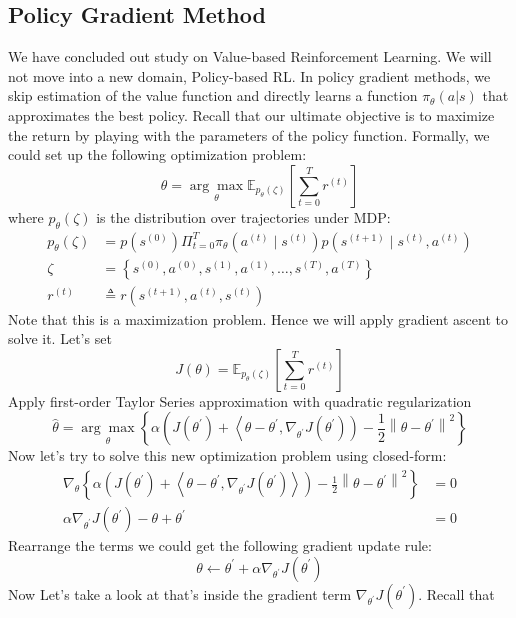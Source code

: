 \documentclass[11pt]{article}
\begin{document}
\subsection{Policy Gradient Method}
We have concluded out study on Value-based Reinforcement Learning. We will not move into a new domain, Policy-based RL. In policy gradient methods, we skip estimation of the value function and directly learns a function $\pi_\theta(a|s)$ that approximates the best policy. Recall that our ultimate objective is to maximize the return by playing with the parameters of the policy function. Formally, we could set up the following optimization problem: $$\hat{\theta}=\underset{\theta}{\arg \max } \mathbb{E}_{p_{\theta}(\zeta)}\left[\sum_{t=0}^{T} r^{(t)}\right]$$ where $p_{\theta}(\zeta)$ is the distribution over trajectories under MDP: 
\begin{align*}
    p_{\theta}(\zeta)&=p\left(s^{(0)}\right) \Pi_{t=0}^{T} \pi_{\theta}\left(a^{(t)} \mid s^{(t)}\right) p\left(s^{(t+1)} \mid s^{(t)}, a^{(t)}\right) \\
\zeta&=\left\{s^{(0)}, a^{(0)}, s^{(1)}, a^{(1)}, \ldots, s^{(T)}, a^{(T)}\right\} \\
r^{(t)} &\triangleq r\left(s^{(t+1)}, a^{(t)}, s^{(t)}\right)
\end{align*}
Note that this is a maximization problem. Hence we will apply gradient ascent to solve it. Let's set $$J(\theta) = \mathbb{E}_{p_{\theta}(\zeta)}\left[\sum_{t=0}^{T} r^{(t)}\right]$$
Apply first-order Taylor Series approximation with quadratic regularization $$\hat{\theta}=\underset{\theta}{\arg \max }\left\{\alpha\left(J\left(\theta^{\prime}\right)+\left\langle\theta-\theta^{\prime}, \nabla_{\theta^{\prime}} J\left(\theta^{\prime}\right)\right)-\frac{1}{2}\left\|\theta-\theta^{\prime}\right\|^{2}\right\}\right.$$ 
Now let's try to solve this new optimization problem using closed-form:
\begin{align*}
\nabla_{\theta}\left\{\alpha\left(J\left(\theta^{\prime}\right)+\left\langle\theta-\theta^{\prime}, \nabla_{\theta^{\prime}} J\left(\theta^{\prime}\right)\right\rangle\right)-\frac{1}{2}\left\|\theta-\theta^{\prime}\right\|^{2}\right\}&=0 \\
\alpha \nabla_{\theta^{\prime}} J\left(\theta^{\prime}\right)-\theta+\theta^{\prime} &=0
\end{align*}
Rearrange the terms we could get the following gradient update rule:
$$\theta \leftarrow \theta^{\prime}+\alpha \nabla_{\theta^{\prime}} J\left(\theta^{\prime}\right)$$
Now Let's take a look at that's inside the gradient term $\nabla_{\theta^{\prime}} J\left(\theta^{\prime}\right)$. Recall that
\end{document}
